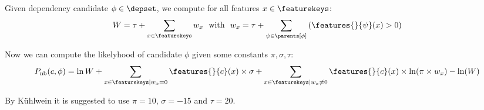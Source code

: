  
Given dependency candidate $\phi \in \depset$, we compute for all features $x \in \featurekeys$:
\[
  W = \tau + \sum_{x \in \featurekeys} w_x ~~\text{with}~~ w_x = \tau + \sum_{\psi \in \parents[\phi]} \left( \features{}{\psi}(x) > 0 \right)
\]

Now we can compute the likelyhood of candidate $\phi$ given some constants $\pi, \sigma, \tau$:
\[
	P_\text{nb}(c, \phi) = \ln W +
  \sum_{x \in \featurekeys | w_x = 0} \features{}{c}(x) \times \sigma +
  \sum_{x \in \featurekeys | w_x \neq 0} \features{}{c}(x) \times \ln(\pi \times w_x) - \ln(W)
\]

By K\"uhlwein \cite{kuhlwein2013mash} it is suggested to use $\pi = 10$, $\sigma = -15$ and $\tau = 20$.
